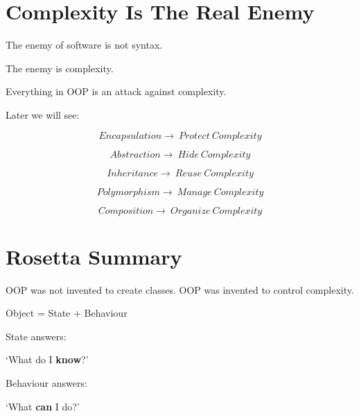 \documentclass[11pt,a4paper]{book}
\begin{document}

\section{Complexity Is The Real Enemy}

\begin{idea}

The enemy of software is not syntax.

The enemy is complexity.

\end{idea}

Everything in OOP is an attack against complexity.

Later we will see:

\[
Encapsulation\rightarrow \ Protect \ Complexity
\]

\[
Abstraction \rightarrow \ Hide \ Complexity
\]

\[
Inheritance\rightarrow \ Reuse \ Complexity
\]

\[
Polymorphism\rightarrow \ Manage \ Complexity
\]

\[
Composition \rightarrow \ Organize \ Complexity
\]


\section{Rosetta Summary}

\begin{rosettarule}

OOP was not invented to create classes.
OOP was invented to control complexity.

\end{rosettarule}

\begin{rosettarule}

Object = State + Behaviour

\end{rosettarule}

\begin{rosettarule}

State answers:

`What do I \textbf{know}?'

\end{rosettarule}

\begin{rosettarule}

Behaviour answers:

`What \textbf{can} I do?'

\end{rosettarule}
\end{document}
